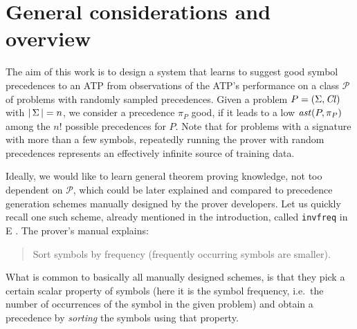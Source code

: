 


\section{General considerations and overview} \label{sect:overview}

The aim of this work is to design a system that learns to suggest good symbol precedences to an ATP 
from observations of the ATP's performance on a class \(\mathcal{P}\) of problems with randomly sampled precedences. 
Given a problem \(P = (\operatorname{\Sigma},\operatorname{\mathit{Cl}})\) with \(|\operatorname{\Sigma}|=n\), we consider a precedence \(\pi_P\) good,
if it leads to a low \(\operatorname{\mathit{ast}}(P,\pi_P)\)
among the $n!$ possible precedences for \(P\).
Note that for problems with a signature with more than a few symbols, repeatedly running the prover 
with random precedences represents an effectively infinite source of training data.

Ideally, we would like to learn general theorem proving knowledge, not too dependent on $\mathcal{P}$,
which could be later explained and compared to precedence generation schemes manually designed 
by the prover developers. Let us quickly recall one such scheme, already mentioned in the introduction,
called \texttt{invfreq} in E \cite{SCV:CADE-2019}. The prover's manual \cite{E-manual} explains:
\begin{quote}
Sort symbols by frequency (frequently occurring symbols are smaller).
\end{quote}
What is common to basically all manually designed schemes, is that they pick a certain scalar property of symbols 
(here it is the symbol frequency, i.e.~the number of occurrences of the symbol in the given problem)
and obtain a precedence by \emph{sorting} the symbols using that property.

